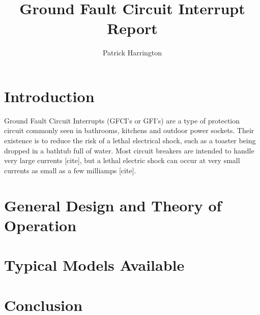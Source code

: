 \documentclass{article}
\title{Ground Fault Circuit Interrupt Report}
\author{Patrick Harrington}
\begin{document}
\maketitle

\section{Introduction}

Ground Fault Circuit Interrupts (GFCI's or GFI's) are a type of protection
circuit commonly seen in bathrooms, kitchens and outdoor power sockets. Their
existence is to reduce the risk of a lethal electrical shock, such as a
toaster being dropped in a bathtub full of water. Most circuit breakers are
intended to handle very large currents [cite], but a lethal electric shock can
occur at very small currents as small as a few milliamps [cite].

\section{General Design and Theory of Operation}

\section{Typical Models Available}

\section{Conclusion}
\end{document}

